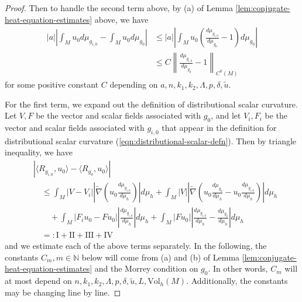 \documentclass[12pt]{amsart}
\theoremstyle{plain}
\theoremstyle{plain}
\theoremstyle{definition}
\theoremstyle{remark}
\numberwithin{equation}{subsection}
\newcommand{\hdel}{\tilde{\nabla}}
\begin{document}
\begin{proof}
\begin{comment}
    Similarly, $g_{i,0} \to g_0$ in $C^0(M)$ also gives us that
    \begin{equation*}
        \lim\limits_{i\to\infty}\left\lVert \frac{d\mu_{g_0}}{d\mu_h} - \frac{d\mu_{g_{i,0}}}{d\mu_h}\right\rVert_{C^0(M)} = 0
    \end{equation*}
    by the same argument as above.
    \end{comment}

    Then to handle the second term above, by (a) of Lemma \ref{lem:conjugate-heat-equation-estimates} above, we have
    \begin{align*}
        |a|\left|\int_M u_0 d\mu_{g_{i,0}} - \int_M u_0 d\mu_{g_0}\right| &\leq |a|\left|\int_M u_0\left(\frac{d\mu_{g_{i,0}}}{d\mu_{g_0}} - 1\right)d\mu_{g_0}\right| \nonumber \\
        &\leq C\left\lVert \frac{d\mu_{g_{i,0}}}{d\mu_{g_0}} - 1\right\rVert_{C^0(M)}
    \end{align*}
    for some positive constant $C$ depending on $a, n, k_1, k_2, \Lambda, p, \delta, \tilde{u}$.

    For the first term, we expand out the definition of distributional scalar curvature. Let $V, F$ be the vector and scalar fields associated with $g_0$, and let $V_i, F_i$ be the vector and scalar fields associated with $g_{i,0}$ that appear in the definition for distributional scalar curvature (\ref{eqn:distributional-scalar-defn}). Then by triangle inequality, we have
    \begin{align*}
        &\left|\langle R_{g_{i,0}},u_0\rangle - \langle R_{g_0}, u_0\rangle\right| \nonumber \\
        &\quad \leq \int_M |V - V_i|\left|\hdel\left(u_0\frac{d\mu_{g_{i,0}}}{d\mu_h}\right)\right|d\mu_h + \int_M |V| \left|\hdel\left(u_0\frac{d\mu_{g_0}}{d\mu_h} - u_0\frac{d\mu_{g_{i,0}}}{d\mu_h}\right)\right|d\mu_h \nonumber \\
        &\qquad + \int_M |F_i u_0 - Fu_0|\left|\frac{d\mu_{g_{i,0}}}{d\mu_h}\right|d\mu_h + \int_M |Fu_0|\left|\frac{d\mu_{g_{i,0}}}{d\mu_h} - \frac{d\mu_{g_0}}{d\mu_h}\right|d\mu_h \nonumber \\
        &\quad =: \text{I} + \text{II} + \text{III} + \text{IV}
    \end{align*}
    and we estimate each of the above terms separately. In the following, the constants $C_m, m \in \mathbb{N}$ below will come from (a) and (b) of Lemma \ref{lem:conjugate-heat-equation-estimates} and the Morrey condition on $g_0$. In other words, $C_m$ will at most depend on $n, k_1, k_2, \Lambda, p, \delta, \tilde{u}, L, \text{Vol}_h(M)$. Additionally, the constants may be changing line by line.


\end{proof}
\end{document}

